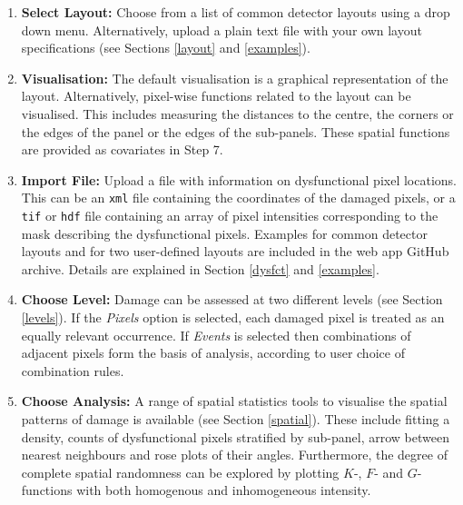 \documentclass[11pt,a4paper]{article}
\begin{document}
\vfill\newpage

\begin{mdframed}

\medskip

\begin{enumerate}

\item {\bf Select Layout:} 
Choose from a list of common detector layouts using a drop down menu. Alternatively, upload a plain text file with your own layout specifications (see Sections \ref{layout} and \ref{examples}).

\item {\bf Visualisation:} 
The default visualisation is a graphical representation of the layout.
Alternatively, pixel-wise functions related to the layout can be visualised. 
This includes measuring the distances to the centre, the corners or the edges of the panel or the edges of the sub-panels. 
These spatial functions are provided as covariates in Step 7.

\item {\bf Import File:} 
Upload a file with information on dysfunctional pixel locations. 
This can be an \texttt{xml} file containing the coordinates of the damaged pixels, or a \texttt{tif} or \texttt{hdf} file containing an array of pixel intensities corresponding to the mask describing the dysfunctional pixels. Examples for common detector layouts and for two user-defined layouts are included in the web app GitHub archive. Details are explained in Section \ref{dysfct} and \ref{examples}.
 
\item {\bf Choose Level:} 
Damage can be assessed at two different levels (see Section \ref{levels}). If the \emph{Pixels} option is selected, each damaged pixel is treated as an equally relevant occurrence. If \emph{Events} is selected then combinations of adjacent pixels form the basis of analysis, according to user choice of combination rules. 

\item {\bf Choose Analysis:} 
A range of spatial statistics tools to visualise the spatial patterns of damage is available (see Section \ref{spatial}). These include fitting a density, counts of dysfunctional pixels stratified by sub-panel, arrow between nearest neighbours and rose plots of their angles. 
Furthermore, the degree of complete spatial randomness can be explored by
plotting $K$-, $F$- and $G$-functions with both homogenous and inhomogeneous intensity.


\end{enumerate}
\end{mdframed}
\end{document}

